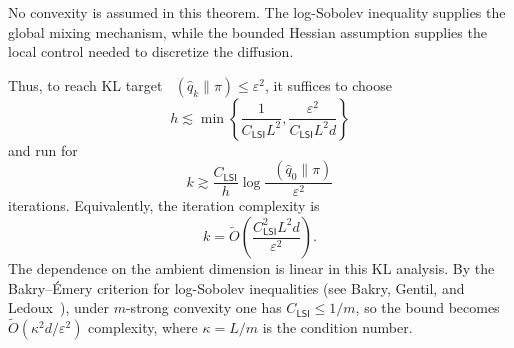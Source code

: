 \documentclass[10pt,a4paper]{amsart}
\numberwithin{equation}{section}
\DeclareMathOperator{\KL}{D_{\mathsf{KL}}}
\newcommand{\wh}[1]{\widehat{#1}}
\newcommand{\deltaerr}{\varepsilon}
\newcommand{\tO}{\widetilde O}
\begin{document}
No convexity is assumed in this theorem.  The log-Sobolev inequality supplies
the global mixing mechanism, while the bounded Hessian assumption supplies the
local control needed to discretize the diffusion.

Thus, to reach KL target
$\KL(\wh q_k\|\pi)\leq \deltaerr^2$, it suffices to choose
\[
    h\lesssim
    \min\left\{
    \frac{1}{C_{\mathsf{LSI}}L^2},
    \frac{\deltaerr^2}{C_{\mathsf{LSI}}L^2d}
    \right\}
\]
and run for
\[
    k
    \gtrsim
    \frac{C_{\mathsf{LSI}}}{h}
    \log\frac{\KL(\wh q_0\|\pi)}{\deltaerr^2}
\]
iterations.  Equivalently, the iteration complexity is
\[
    k=\tO\!\left(
    \frac{C_{\mathsf{LSI}}^2L^2d}{\deltaerr^2}
    \right).
\]
The dependence on the ambient dimension is linear in this KL analysis.  By the
Bakry--\'Emery criterion for log-Sobolev inequalities (see Bakry, Gentil, and
Ledoux~\cite{bakry2014analysis}), under $m$-strong convexity one has
$C_{\mathsf{LSI}}\leq 1/m$, so the bound becomes
$\tO(\kappa^2d/\deltaerr^2)$ complexity, where $\kappa=L/m$ is the condition number.
\end{document}
